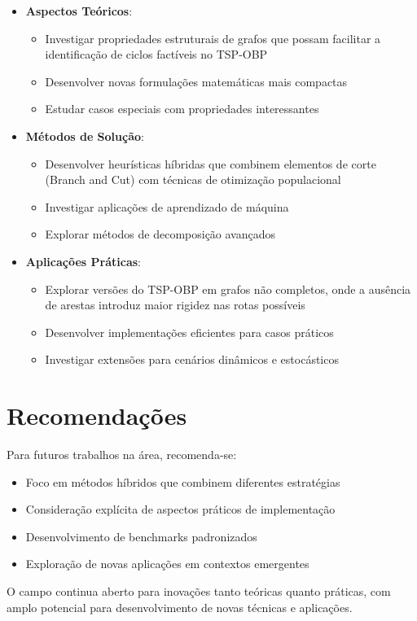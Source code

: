 \documentclass[12pt, a4paper]{report}
\begin{document}
\begin{itemize}
    \item \textbf{Aspectos Teóricos}:
    \begin{itemize}
        \item Investigar propriedades estruturais de grafos que possam facilitar a identificação de ciclos factíveis no TSP-OBP
        \item Desenvolver novas formulações matemáticas mais compactas
        \item Estudar casos especiais com propriedades interessantes
    \end{itemize}
    
    \item \textbf{Métodos de Solução}:
    \begin{itemize}
        \item Desenvolver heurísticas híbridas que combinem elementos de corte (Branch and Cut) com técnicas de otimização populacional
        \item Investigar aplicações de aprendizado de máquina
        \item Explorar métodos de decomposição avançados
    \end{itemize}
    
    \item \textbf{Aplicações Práticas}:
    \begin{itemize}
        \item Explorar versões do TSP-OBP em grafos não completos, onde a ausência de arestas introduz maior rigidez nas rotas possíveis
        \item Desenvolver implementações eficientes para casos práticos
        \item Investigar extensões para cenários dinâmicos e estocásticos
    \end{itemize}
\end{itemize}

\section{Recomendações}

Para futuros trabalhos na área, recomenda-se:

\begin{itemize}
    \item Foco em métodos híbridos que combinem diferentes estratégias
    \item Consideração explícita de aspectos práticos de implementação
    \item Desenvolvimento de benchmarks padronizados
    \item Exploração de novas aplicações em contextos emergentes
\end{itemize}

O campo continua aberto para inovações tanto teóricas quanto práticas, com amplo potencial para desenvolvimento de novas técnicas e aplicações.

\newpage
\renewcommand{\refname}{Referências Bibliográficas}

\nocite{lopesfilho2019, carvalho2022, carnielli}
\end{document}
